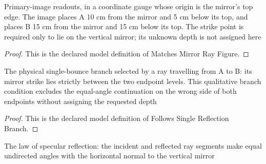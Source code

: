 \begin{definition}
  \label{def:physics:phyx-mini-0061:phyxminiproblems-problemphyxmini0061-matchesmirrorrayfigure}
  Primary-image readouts, in a coordinate gauge whose origin is the mirror's top edge. The image places A 10 cm from the mirror and 5 cm below its top, and places B 15 cm from the mirror and 15 cm below its top. The strike point is required only to lie on the vertical mirror; its unknown depth is not assigned here
\end{definition}
\begin{proof}
  This is the declared model definition of Matches Mirror Ray Figure.
\end{proof}
\begin{definition}
  \label{def:physics:phyx-mini-0061:phyxminiproblems-problemphyxmini0061-followssinglereflectionbranch}
  The physical single-bounce branch selected by a ray travelling from A to B: its mirror strike lies strictly between the two endpoint levels. This qualitative branch condition excludes the equal-angle continuation on the wrong side of both endpoints without assigning the requested depth
\end{definition}
\begin{proof}
  This is the declared model definition of Follows Single Reflection Branch.
\end{proof}
\begin{definition}
  \label{def:physics:phyx-mini-0061:phyxminiproblems-problemphyxmini0061-satisfieslawofreflection}
  The law of specular reflection: the incident and reflected ray segments make equal undirected angles with the horizontal normal to the vertical mirror
\end{definition}

